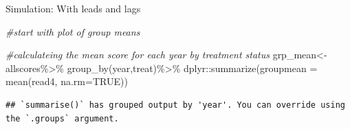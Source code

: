 \documentclass[
  ignorenonframetext,
]{beamer}
\newenvironment{Shaded}{\begin{snugshade}}{\end{snugshade}}
\newcommand{\AttributeTok}[1]{\textcolor[rgb]{0.77,0.63,0.00}{#1}}
\newcommand{\CommentTok}[1]{\textcolor[rgb]{0.56,0.35,0.01}{\textit{#1}}}
\newcommand{\ConstantTok}[1]{\textcolor[rgb]{0.00,0.00,0.00}{#1}}
\newcommand{\DecValTok}[1]{\textcolor[rgb]{0.00,0.00,0.81}{#1}}
\newcommand{\FunctionTok}[1]{\textcolor[rgb]{0.00,0.00,0.00}{#1}}
\newcommand{\NormalTok}[1]{#1}
\newcommand{\OtherTok}[1]{\textcolor[rgb]{0.56,0.35,0.01}{#1}}
\newcommand{\SpecialCharTok}[1]{\textcolor[rgb]{0.00,0.00,0.00}{#1}}
\newcommand{\StringTok}[1]{\textcolor[rgb]{0.31,0.60,0.02}{#1}}
\begin{document}
\begin{frame}[fragile]{Simulation: With leads and lags}
\protect\hypertarget{simulation-with-leads-and-lags-4}{}
\tiny

\begin{Shaded}
\begin{Highlighting}[]
\CommentTok{\#start with plot of group means}

\CommentTok{\#calculateing the mean score for each year by treatment status}
\NormalTok{grp\_mean}\OtherTok{\textless{}{-}}\NormalTok{allscores}\SpecialCharTok{\%\textgreater{}\%}
    \FunctionTok{group\_by}\NormalTok{(year,treat)}\SpecialCharTok{\%\textgreater{}\%}
\NormalTok{    dplyr}\SpecialCharTok{::}\FunctionTok{summarize}\NormalTok{(}\AttributeTok{groupmean =} \FunctionTok{mean}\NormalTok{(read4, }\AttributeTok{na.rm=}\ConstantTok{TRUE}\NormalTok{))}
\end{Highlighting}
\end{Shaded}

\begin{verbatim}
## `summarise()` has grouped output by 'year'. You can override using the `.groups` argument.
\end{verbatim}

\begin{Shaded}
\end{Shaded}
\end{frame}
\end{document}
